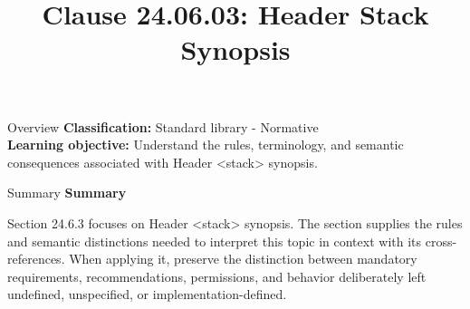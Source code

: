 \documentclass[10pt,letterpaper]{article}
\title{Clause 24.06.03: Header Stack Synopsis}
\author{}
\date{}
\begin{document}
\maketitle
\begin{CornellOverviewBox}{Overview}
\textbf{Classification:} Standard library - Normative\\[2pt]
\textbf{Learning objective:} Understand the rules, terminology, and semantic consequences associated with Header <stack> synopsis.
\end{CornellOverviewBox}\begin{CornellSummaryBox}{Summary}
{\sffamily\bfseries\color{Accent} Summary}\par\vspace{3pt}Section 24.6.3 focuses on Header <stack> synopsis. The section supplies the rules and semantic distinctions needed to interpret this topic in context with its cross-references. When applying it, preserve the distinction between mandatory requirements, recommendations, permissions, and behavior deliberately left undefined, unspecified, or implementation-defined.
\end{CornellSummaryBox}
\end{document}
